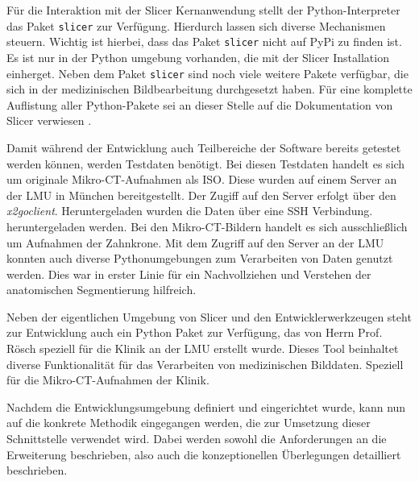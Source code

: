 Für die Interaktion mit der Slicer Kernanwendung stellt der Python-Interpreter das
Paket \texttt{slicer} zur Verfügung. Hierdurch lassen sich diverse Mechanismen steuern.
Wichtig ist hierbei, dass das Paket \texttt{slicer} nicht auf \ac{PyPi} zu finden
ist. Es ist nur in der Python umgebung vorhanden, die mit der Slicer Installation
einherget. Neben dem Paket \texttt{slicer} sind noch viele weitere Pakete verfügbar,
die sich in der medizinischen Bildbearbeitung durchgesetzt haben. Für eine komplette
Auflistung aller Python-Pakete sei an dieser Stelle auf die Dokumentation von Slicer
verwiesen \citep[vgl.][]{slicer2024}.

Damit während der Entwicklung auch Teilbereiche der Software bereits getestet
werden können, werden Testdaten benötigt. Bei diesen Testdaten handelt es sich
um originale Mikro-\ac{CT}-Aufnahmen als \ac{ISO}. Diese wurden auf einem Server
an der \ac{LMU} in München bereitgestellt. Der Zugiff auf den Server erfolgt über
den \textit{x2goclient}. Heruntergeladen wurden die Daten über eine \ac{SSH}
Verbindung. heruntergeladen werden. Bei den Mikro-CT-Bildern handelt es sich
ausschließlich um Aufnahmen der Zahnkrone. Mit dem Zugriff auf den Server an der
\ac{LMU} konnten auch diverse Pythonumgebungen zum Verarbeiten von Daten genutzt
werden. Dies war in erster Linie für ein Nachvollziehen und Verstehen der anatomischen
Segmentierung hilfreich.

Neben der eigentlichen Umgebung von Slicer und den Entwicklerwerkzeugen steht zur
Entwicklung auch ein Python Paket zur Verfügung, das von Herrn Prof. Rösch speziell
für die Klinik an der \ac{LMU} erstellt wurde. Dieses Tool beinhaltet diverse Funktionalität
für das Verarbeiten von medizinischen Bilddaten. Speziell für die Mikro-\ac{CT}-Aufnahmen
der Klinik.

Nachdem die Entwicklungsumgebung definiert und eingerichtet wurde, kann nun auf
die konkrete Methodik eingegangen werden, die zur Umsetzung dieser Schnittstelle
verwendet wird. Dabei werden sowohl die Anforderungen an die Erweiterung
beschrieben, also auch die konzeptionellen Überlegungen detailliert beschrieben.


